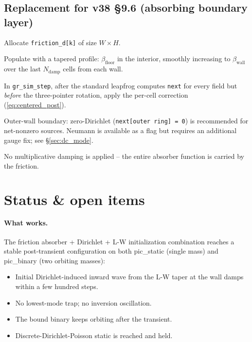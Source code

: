 \documentclass[11pt,a4paper]{article}
\begin{document}
\subsection*{Replacement for v38 \S 9.6 (absorbing boundary layer)}

\begin{algsteps}
  \item Allocate \texttt{friction\_d[k]} of size $W \times H$.
  \item Populate with a tapered profile: $\beta_\text{floor}$ in the
    interior, smoothly increasing to $\beta_\text{wall}$ over the
    last $N_\text{damp}$ cells from each wall.
  \item In \texttt{gr\_sim\_step}, after the standard leapfrog
    computes \texttt{next} for every field but \emph{before} the
    three-pointer rotation, apply the per-cell correction
    (\ref{eq:centered_post}).
  \item Outer-wall boundary: zero-Dirichlet (\texttt{next[outer ring]
    = 0}) is recommended for net-nonzero sources.  Neumann is
    available as a flag but requires an additional gauge fix; see
    \S\ref{sec:dc_mode}.
  \item No multiplicative damping is applied -- the entire absorber
    function is carried by the friction.
\end{algsteps}

\section{Status \& open items}

\paragraph{What works.}  The friction absorber + Dirichlet + L-W
initialization combination reaches a stable post-transient
configuration on both pic\_static (single mass) and pic\_binary (two
orbiting masses):
\begin{itemize}[leftmargin=*,nosep]
  \item Initial Dirichlet-induced inward wave from the L-W taper at
    the wall damps within a few hundred steps.
  \item No lowest-mode trap; no inversion oscillation.
  \item The bound binary keeps orbiting after the transient.
  \item Discrete-Dirichlet-Poisson static is reached and held.
\end{itemize}
\end{document}
